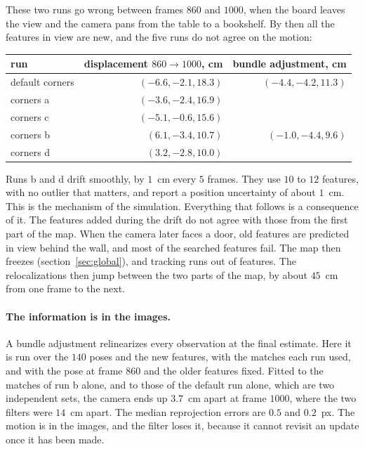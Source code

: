 \documentclass[11pt]{article}
\begin{document}
These two runs go wrong between frames $860$ and $1000$, when the board leaves the view and the
camera pans from the table to a bookshelf. By then all the features in view are new, and the five
runs do not agree on the motion:

\begin{center}
\begin{tabular}{lrr}
  run & displacement $860 \to 1000$, cm & bundle adjustment, cm \\
  \hline
  default corners & $(-6.6, -2.1, 18.3)$ & $(-4.4, -4.2, 11.3)$ \\
  corners a & $(-3.6, -2.4, 16.9)$ & \\
  corners c & $(-5.1, -0.6, 15.6)$ & \\
  corners b & $(6.1, -3.4, 10.7)$ & $(-1.0, -4.4, 9.6)$ \\
  corners d & $(3.2, -2.8, 10.0)$ & \\
\end{tabular}
\end{center}

Runs b and d drift smoothly, by $1$~cm every $5$ frames. They use $10$ to $12$ features, with no
outlier that matters, and report a position uncertainty of about $1$~cm. This is the
mechanism of the simulation. Everything that follows is a consequence of it. The features added
during the drift do not agree with those from the first part of the map. When the camera later
faces a door, old features are predicted in view behind the wall, and most of the searched
features fail. The map then freezes (section~\ref{sec:global}), and tracking runs out of features. The relocalizations then
jump between the two parts of the map, by about $45$~cm from one frame to the next.

\paragraph{The information is in the images.}
A bundle adjustment relinearizes every observation at the final estimate. Here it is run over the
$140$ poses and the new features, with the matches each run used, and with the pose at frame $860$
and the older features fixed. Fitted to the matches of run b alone, and to those of the default run alone, which are two
independent sets, the camera ends up $3.7$~cm apart at frame $1000$, where the two filters were
$14$~cm apart. The median reprojection errors are $0.5$ and $0.2$~px. The motion is in the images,
and the filter loses it, because it cannot revisit an update once it has been made.
\end{document}
